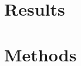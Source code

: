 \documentclass[11pt]{article} %
\begin{document}






\section{Results} %
\label{sec:results}


\section{Methods} %
\label{sec:methods}


\printbibliography
    
\end{document}
